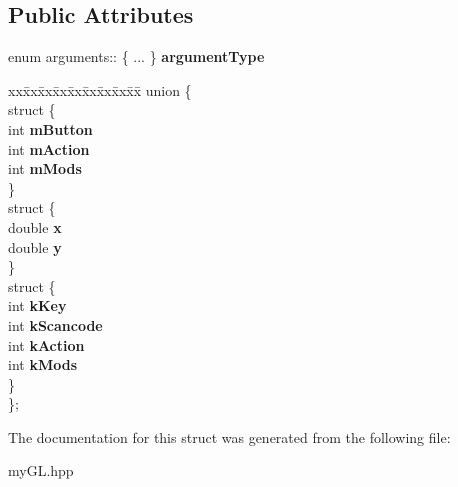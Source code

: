 \subsection*{Public Attributes}
\begin{DoxyCompactItemize}
\item 
enum arguments\+:: \{ ... \}  {\bfseries argument\+Type}\hypertarget{structarguments_abf519974b87f99e908f228df4e753744}{}\label{structarguments_abf519974b87f99e908f228df4e753744}

\item 
\begin{tabbing}
xx\=xx\=xx\=xx\=xx\=xx\=xx\=xx\=xx\=\kill
union \{\\
\>struct \{\\
\>\>int {\bfseries mButton}\\
\>\>int {\bfseries mAction}\\
\>\>int {\bfseries mMods}\\
\>\} \hypertarget{unionarguments_1_1_0D8_a71eb30254262533dafc77d824d1dadd4}{}\label{unionarguments_1_1_0D8_a71eb30254262533dafc77d824d1dadd4}
\\
\>struct \{\\
\>\>double {\bfseries x}\\
\>\>double {\bfseries y}\\
\>\} \hypertarget{unionarguments_1_1_0D8_aaefa80bdc5f207233c2aa3ef30923001}{}\label{unionarguments_1_1_0D8_aaefa80bdc5f207233c2aa3ef30923001}
\\
\>struct \{\\
\>\>int {\bfseries kKey}\\
\>\>int {\bfseries kScancode}\\
\>\>int {\bfseries kAction}\\
\>\>int {\bfseries kMods}\\
\>\} \hypertarget{unionarguments_1_1_0D8_a7400297ef620036daccc345479784f2d}{}\label{unionarguments_1_1_0D8_a7400297ef620036daccc345479784f2d}
\\
\}; \hypertarget{structarguments_a8c1f2ecb9a1af0bbb664198b0adde3f7}{}\label{structarguments_a8c1f2ecb9a1af0bbb664198b0adde3f7}
\\

\end{tabbing}\end{DoxyCompactItemize}


The documentation for this struct was generated from the following file\+:\begin{DoxyCompactItemize}
\item 
my\+G\+L.\+hpp\end{DoxyCompactItemize}
